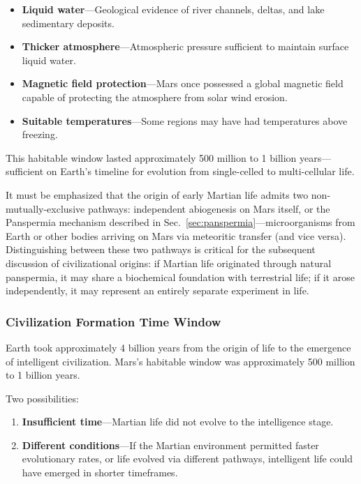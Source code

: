 \documentclass[aps,prd,twocolumn,superscriptaddress,nofootinbib]{revtex4-2}
\begin{document}
\begin{itemize}
  \item \textbf{Liquid water}---Geological evidence of river channels, deltas, and lake sedimentary deposits.
  \item \textbf{Thicker atmosphere}---Atmospheric pressure sufficient to maintain surface liquid water.
  \item \textbf{Magnetic field protection}---Mars once possessed a global magnetic field capable of protecting the atmosphere from solar wind erosion.
  \item \textbf{Suitable temperatures}---Some regions may have had temperatures above freezing.
\end{itemize}

This habitable window lasted approximately 500 million to 1 billion years---sufficient on Earth's timeline for evolution from single-celled to multi-cellular life.

It must be emphasized that the origin of early Martian life admits two non-mutually-exclusive pathways: independent abiogenesis on Mars itself, or the Panspermia mechanism described in Sec.~\ref{sec:panspermia}---microorganisms from Earth or other bodies arriving on Mars via meteoritic transfer (and vice versa). Distinguishing between these two pathways is critical for the subsequent discussion of civilizational origins: if Martian life originated through natural panspermia, it may share a biochemical foundation with terrestrial life; if it arose independently, it may represent an entirely separate experiment in life.

\subsubsection{Civilization Formation Time Window}\label{sec:mars-window}

Earth took approximately 4 billion years from the origin of life to the emergence of intelligent civilization. Mars's habitable window was approximately 500 million to 1 billion years.

Two possibilities:

\begin{enumerate}
  \item \textbf{Insufficient time}---Martian life did not evolve to the intelligence stage.
  \item \textbf{Different conditions}---If the Martian environment permitted faster evolutionary rates, or life evolved via different pathways, intelligent life could have emerged in shorter timeframes.
\end{enumerate}
\end{document}

